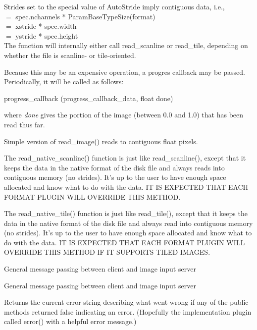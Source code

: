 Strides set to the special value of {\kw AutoStride} imply contiguous
data, i.e., \\
 $=$ {\kw spec.nchannels * ParamBaseTypeSize(format)} \\
 $=$ {\kw xstride * spec.width} \\
 $=$ {\kw ystride * spec.height} \\
The function will internally either call {\kw read_scanline} or 
{\kw read_tile}, depending on whether the file is scanline- or
tile-oriented.

Because this may be an expensive operation, a progres callback may be passed.
Periodically, it will be called as follows:\\
\begin{code}
    progress_callback (progress_callback_data, float done)
\end{code}
\noindent where \emph{done} gives the portion of the image 
(between 0.0 and 1.0) that has been read thus far.
\apiend

Simple version of {\kw read_image()} reads to contiguous float pixels.
\apiend

The {\kw read_native_scanline()} function is just like {\kw
  read_scanline()}, except that it keeps the data in the native format
of the disk file and always reads into contiguous memory (no strides).
It's up to the user to have enough space allocated and know what to do
with the data.  IT IS EXPECTED THAT EACH FORMAT PLUGIN WILL OVERRIDE
THIS METHOD.
\apiend

The {\kw read_native_tile()} function is just like {\kw read_tile()}, 
except that it keeps the data in the native format of the disk file and
always read into contiguous memory (no strides).  It's up to the user to
have enough space allocated and know what to do with the data.  IT IS
EXPECTED THAT EACH FORMAT PLUGIN WILL OVERRIDE THIS METHOD IF IT
SUPPORTS TILED IMAGES.
\apiend

General message passing between client and image input server
\apiend

General message passing between client and image input server
\apiend

Returns the current error string describing what went wrong if
any of the public methods returned {\kw false} indicating an error.
(Hopefully the implementation plugin called {\kw error()} with a
helpful error message.)
\apiend




\chapwidthend
